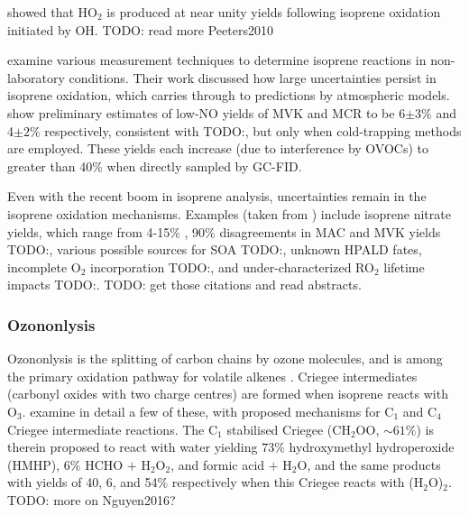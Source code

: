     \cite{Peeters2010} showed that HO$_2$ is produced at near unity yields following isoprene oxidation initiated by OH.
    TODO: read more Peeters2010
    
    \cite{Nguyen2014} examine various measurement techniques to determine isoprene reactions in non-laboratory conditions.
    Their work discussed how large uncertainties persist in isoprene oxidation, which carries through to predictions by atmospheric models.
    \cite{Nguyen2014} show preliminary estimates of low-NO yields of MVK and MCR to be 6$\pm3\%$ and 4$\pm2\%$ respectively, consistent with TODO:\cite{Liu2013}, but only when cold-trapping methods are employed.
    These yields each increase (due to interference by OVOCs) to greater than 40\% when directly sampled by GC-FID.
    
    Even with the recent boom in isoprene analysis, uncertainties remain in the isoprene oxidation mechanisms.
    Examples (taken from \cite{Nguyen2014}) include isoprene nitrate yields, which range from 4-15\% \citep{Paulot2009a}, 90\% disagreements in MAC and MVK yields TODO:\citep{Liu2013}, various possible sources for SOA TODO:\citep{Chan2010, Surratt2010, Lin2013}, unknown HPALD fates, incomplete O$_2$ incorporation TODO:\citep{Peeters2009,Crounse2013}, and under-characterized RO$_2$ lifetime impacts TODO:\citep{Wolfe2012}. TODO: get those citations and read abstracts.
    
    \subsubsection{Ozononlysis}
    Ozononlysis is the splitting of carbon chains by ozone molecules, and is among the primary oxidation pathway for volatile alkenes \citep{Nguyen2016}.
    Criegee intermediates (carbonyl oxides with two charge centres) are formed when isoprene reacts with O$_3$. 
    \cite{Nguyen2016} examine in detail a few of these, with proposed mechanisms for C$_1$ and C$_4$ Criegee intermediate reactions.
    The C$_1$ stabilised Criegee (CH$_2$OO, $\sim 61\%$) is therein proposed to react with water yielding $73\%$ hydroxymethyl hydroperoxide (HMHP), $6\%$ HCHO $+$ H$_2$O$_2$, and formic acid $+$ H$_2$O, and the same products with yields of 40, 6, and 54$\%$ respectively when this Criegee reacts with (H$_2$O)$_2$.
    TODO: more on Nguyen2016?
    
